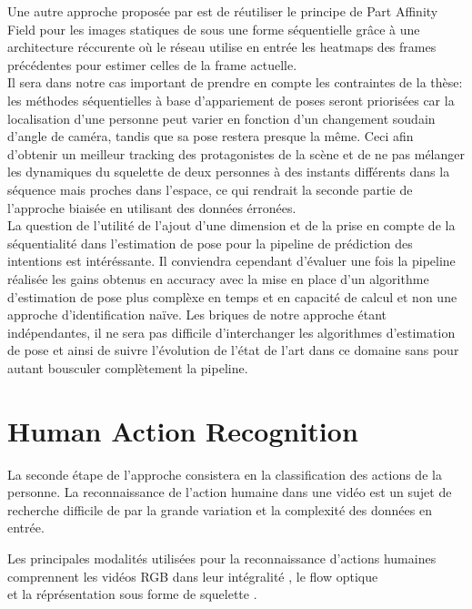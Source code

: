 Une autre approche proposée par \cite{Raaj_2019_CVPR} est de réutiliser le principe de Part Affinity Field pour les images statiques de \cite{cao2017realtime} sous une forme séquentielle grâce à une architecture réccurente où le réseau utilise en entrée les heatmaps des frames précédentes pour estimer celles de la frame actuelle.\\

Il sera dans notre cas important de prendre en compte les contraintes de la thèse: les méthodes séquentielles à base d'appariement de poses seront priorisées car la localisation d'une personne peut varier en fonction d'un changement soudain d'angle de caméra, tandis que sa pose restera presque la même. Ceci afin d'obtenir un meilleur tracking des protagonistes de la scène et de ne pas mélanger les dynamiques du squelette de deux personnes à des instants différents dans la séquence mais proches dans l'espace, ce qui rendrait la seconde partie de l'approche biaisée en utilisant des données érronées.\\

La question de l'utilité de l'ajout d'une dimension et de la prise en compte de la séquentialité dans l'estimation de pose pour la pipeline de prédiction des intentions est intéréssante.
Il conviendra cependant d'évaluer une fois la pipeline réalisée les gains obtenus en accuracy avec la mise en place d'un algorithme d'estimation de pose plus complèxe en temps et en capacité de calcul et non une approche d'identification naïve. Les briques de notre approche étant indépendantes, il ne sera pas difficile d'interchanger les algorithmes d'estimation de pose et ainsi de suivre l'évolution de l'état de l'art dans ce domaine sans pour autant bousculer complètement la pipeline.

\section{Human Action Recognition}
\label{subsec:HAR}

La seconde étape de l'approche consistera en la classification des actions de la personne. La reconnaissance de l'action humaine dans une vidéo est un sujet de recherche difficile de par la grande variation et la complexité des données en entrée.

Les principales modalités utilisées pour la reconnaissance d'actions humaines comprennent les vidéos RGB dans leur intégralité \cite{donahue2015long,2014arXiv1412.0767T,varol2017long,Wu_2018_CVPR}, le flow optique \cite{simonyan2014two}\\\cite{zhang2016real}\cite{sevilla2018integration,DanutPOP} et la réprésentation sous forme de squelette \cite{vemulapalli2014human,du2015hierarchical,2016arXiv160707043L,2018arXiv180107455Y}.

